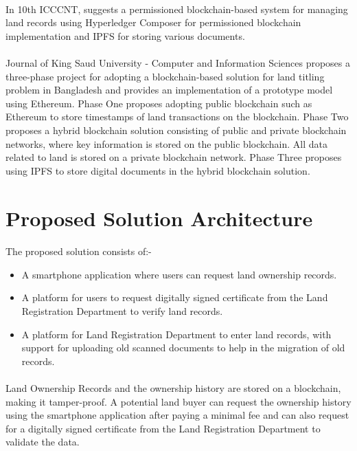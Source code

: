 \documentclass{article}
\begin{document}
        \paragraph{}
        In 10th ICCCNT, \cite{8944471} suggests a permissioned blockchain-based system for managing land records using Hyperledger Composer for permissioned blockchain implementation and IPFS for storing various documents.

        \paragraph{}
        Journal of King Saud University - Computer and Information Sciences \cite{ALAM2020} proposes a three-phase project for adopting a blockchain-based solution for land titling problem in Bangladesh and provides an implementation of a prototype model using Ethereum. Phase One proposes adopting public blockchain such as Ethereum to store timestamps of land transactions on the blockchain. Phase Two proposes a hybrid blockchain solution consisting of public and private blockchain networks, where key information is stored on the public blockchain. All data related to land is stored on a private blockchain network. Phase Three proposes using IPFS to store digital documents in the hybrid blockchain solution.



\section{Proposed Solution Architecture}
    \paragraph{}
    The proposed solution consists of:-

    \begin{itemize}
        \item A smartphone application where users can request land ownership records.
        \item A platform for users to request digitally signed certificate from the Land Registration Department to verify land records.
        \item A platform for Land Registration Department to enter land records, with support for uploading old scanned documents to help in the migration of old records.
    \end{itemize}

    \paragraph{}
    Land Ownership Records and the ownership history are stored on a blockchain, making it tamper-proof. A potential land buyer can request the ownership history using the smartphone application after paying a minimal fee and can also request for a digitally signed certificate from the Land Registration Department to validate the data.
\end{document}
